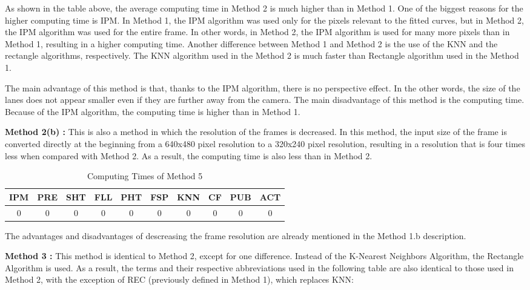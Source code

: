 As shown in the table above, the average computing time in Method 2 is much higher than in Method 1. One of the biggest reasons for the higher computing time is IPM. In Method 1, the IPM algorithm was used only for the pixels relevant to the fitted curves, but in Method 2, the IPM algorithm was used for the entire frame. In other words, in Method 2, the IPM algorithm is used for many more pixels than in Method 1, resulting in a higher computing time. Another difference between Method 1 and Method 2 is the use of the KNN and the rectangle algorithms, respectively. The KNN algorithm used in the Method 2 is much faster than Rectangle algorithm used in the Method 1.

The main advantage of this method is that, thanks to the IPM algorithm, there is no perspective
effect. In the other words, the size of the lanes does not appear smaller even if they are further away from the camera. The main disadvantage of this method is the computing time. Because of the IPM algorithm, the computing time is higher than in Method 1.



\textbf{Method 2(b) : }This is also a method in which the resolution of the frames is decreased. In this method, the input size of the frame is converted directly at the beginning from a 640x480 pixel resolution to a 320x240 pixel resolution, resulting in a resolution that is four times less when compared with Method 2. As a result, the computing time is also less than in Method 2.


\begin{table}[ht]
\caption{Computing Times of Method 5} 
\centering 
  \begin{tabular}{ | c | c | c | c | c | c | c | c | c | c |}
    \hline
  
  IPM 		& PRE 		& SHT	   & FLL 	   & PHT 	   & FSP 	    & KNN 	   & CF 	  & PUB 	& ACT \\ \hline  
  0   &  0  &  0  &  0  &  0  &  0 &  0  &  0  & 0 & 0\\ \hline  
    
    
      \end{tabular}
  \label{tab:Case5_Times}
\end{table}


The advantages and disadvantages of descreasing the frame resolution are already mentioned in the Method 1.b description.




\textbf{Method 3 : }This method is identical to Method 2, except for one difference. Instead of the
K-Nearest Neighbors Algorithm, the Rectangle Algorithm is used. As a result, the terms and their respective abbreviations used in the following table are also identical to those used in Method 2, with the exception of REC (previously defined in Method 1), which replaces KNN:



